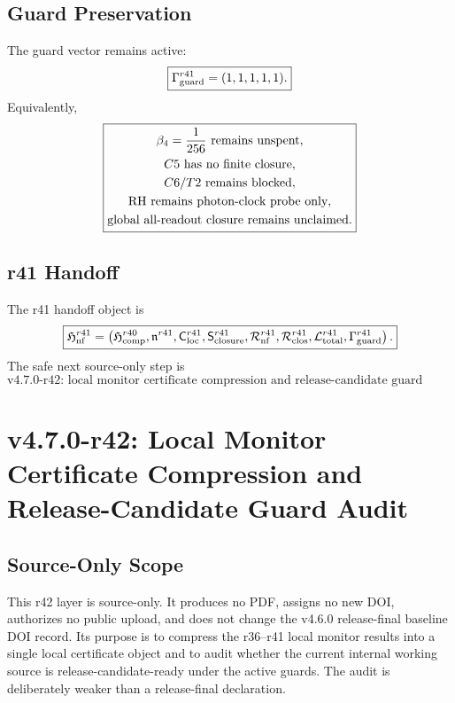 \subsection{Guard Preservation}
\label{subsec:r41-guard-preservation}

The guard vector remains active:
\[
\boxed{
\Gamma_{\rm guard}^{r41}=(1,1,1,1,1).
}
\]
Equivalently,
\[
\boxed{
\begin{gathered}
\beta_4={1\over256}\hbox{ remains unspent},\\
C5\hbox{ has no finite closure},\\
C6/T2\hbox{ remains blocked},\\
\mathrm{RH}\hbox{ remains photon-clock probe only},\\
\hbox{global all-readout closure remains unclaimed}.
\end{gathered}
}
\]

\subsection{r41 Handoff}
\label{subsec:r41-handoff}

The r41 handoff object is
\[
\boxed{
\mathfrak H_{\rm nf}^{r41}
=
\left(
\mathfrak H_{\rm comp}^{r40},
\mathfrak n^{r41},
\mathsf C_{\rm loc}^{r41},
\mathsf S_{\rm closure}^{r41},
\mathcal R_{\rm nf}^{r41},
\mathcal R_{\rm clos}^{r41},
\mathcal L_{\rm total}^{r41},
\Gamma_{\rm guard}^{r41}
\right).
}
\]
The safe next source-only step is
\[
\boxed{
\text{v4.7.0-r42: local monitor certificate compression and release-candidate guard audit.}
}
\]


\section{v4.7.0-r42: Local Monitor Certificate Compression and Release-Candidate Guard Audit}
\label{sec:v470-r42-monitor-certificate-rc-guard}

\subsection{Source-Only Scope}
\label{subsec:r42-source-only-scope}

This r42 layer is source-only.  It produces no PDF, assigns no new DOI,
authorizes no public upload, and does not change the v4.6.0 release-final
baseline DOI record.  Its purpose is to compress the r36--r41 local monitor
results into a single local certificate object and to audit whether the current
internal working source is release-candidate-ready under the active guards.
The audit is deliberately weaker than a release-final declaration.


